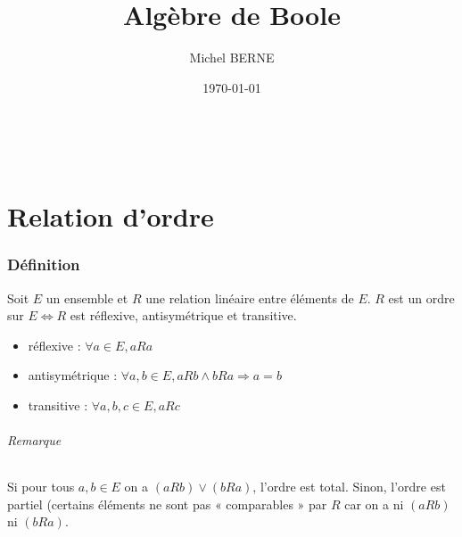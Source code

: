 \documentclass[11pt]{article}
\begin{document}
    \title{Algèbre de Boole}
    \author{Michel BERNE}
    \date{\today}

\maketitle
\setcounter{page}{0} \thispagestyle{empty} %
\newpage
\setcounter{page}{2} %
~\\
\newpage

\renewcommand{\contentsname}{Sommaire}
\tableofcontents

\newpage
\part{Relation d'ordre}
    \section{Définition}
        Soit $E$ un ensemble et $R$ une relation linéaire entre éléments de $E$. $R$ est un ordre sur $E \Leftrightarrow R$ est réflexive, antisymétrique et transitive.
        \begin{itemize}
            \item réflexive : $\forall a\in E,aRa$
            \item antisymétrique : $\forall a,b\in E,aRb\land bRa\Rightarrow a=b$
            \item transitive : $\forall a,b,c\in E,aRc$
        \end{itemize}

        \paragraph{Remarque} Si pour tous $a,b\in E$ on a $(aRb)\lor(bRa)$, l'ordre est total. Sinon, l'ordre est partiel (certains éléments ne sont pas « comparables » par $R$ car on a ni $(aRb)$ ni $(bRa)$.
\end{document}
